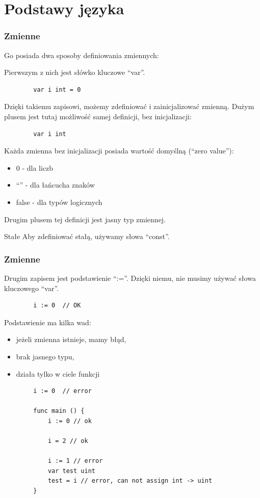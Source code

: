 \documentclass[10pt]{beamer}
\newcommand{\quotes}[1]{``#1''}
\begin{document}
\section[Język]{Podstawy języka}
\begin{frame}[fragile]
    \frametitle{Zmienne}
    Go posiada dwa sposoby definiowania zmiennych:

    Pierwszym z nich jest słówko kluczowe \quotes{var}.
    \begin{verbatim}
        var i int = 0
    \end{verbatim}

    Dzięki takiemu zapisowi, możemy zdefiniować i zainicjalizować zmienną.
    Dużym plusem jest tutaj możliwość samej definicji, bez inicjalizacji:

    \begin{verbatim}
        var i int
    \end{verbatim}

    Każda zmienna bez inicjalizacji posiada wartość domyślną (\quotes{zero value}):
    \begin{itemize}
        \item 0 - dla liczb
        \item \quotes{} - dla łańcucha znaków
        \item false - dla typów logicznych
    \end{itemize}

    Drugim plusem tej definicji jest jasny typ zmiennej.

    \begin{block}{Stałe}
        Aby zdefiniować stałą, używamy słowa \quotes{const}.
    \end{block}
\end{frame}

\begin{frame}[fragile]
    \frametitle{Zmienne}
    Drugim zapisem jest podstawienie \quotes{:=}. Dzięki niemu, nie musimy używać słowa
    kluczowego \quotes{var}.

    \begin{verbatim}
        i := 0  // OK
    \end{verbatim}

    Podstawienie ma kilka wad:
    \begin{itemize}
        \item jeżeli zmienna istnieje, mamy błąd,
        \item brak jasnego typu,
        \item działa tylko w ciele funkcji
    \end{itemize}

    \begin{verbatim}
        i := 0  // error

        func main () {
            i := 0 // ok

            i = 2 // ok

            i := 1 // error
            var test uint
            test = i // error, can not assign int -> uint
        }
    \end{verbatim}
\end{frame}
\end{document}
